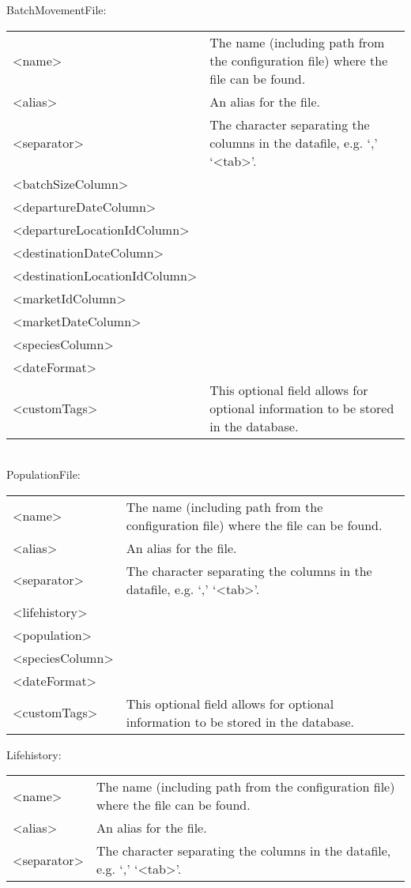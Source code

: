 BatchMovementFile:

\begin{tabulary}{1.0\textwidth}{l p{9cm}}
\toprule
<name> & The name (including path from the configuration file) where the file can be found.\\
<alias> & An alias for the file.\\
<separator> & The character separating the columns in the datafile, e.g. `,' `<tab>'.\\
<batchSizeColumn> & \\
<departureDateColumn> & \\
<departureLocationIdColumn> & \\
<destinationDateColumn> & \\
<destinationLocationIdColumn> & \\
<marketIdColumn> & \\
<marketDateColumn> & \\
<speciesColumn> & \\
<dateFormat> & \\
<customTags> & This optional field allows for optional information to be stored in the database.\\
\bottomrule
\end{tabulary}\\

PopulationFile:

\begin{tabulary}{1.0\textwidth}{l p{9cm}}
\toprule
<name> & The name (including path from the configuration file) where the file can be found.\\
<alias> & An alias for the file.\\
<separator> & The character separating the columns in the datafile, e.g. `,' `<tab>'.\\
<lifehistory> & \\
<population> & \\
<speciesColumn> & \\
<dateFormat> & \\
<customTags> & This optional field allows for optional information to be stored in the database.\\
\bottomrule
\end{tabulary}

Lifehistory:

\begin{tabulary}{1.0\textwidth}{l p{9cm}}
\toprule
<name> & The name (including path from the configuration file) where the file can be found.\\
<alias> & An alias for the file.\\
<separator> & The character separating the columns in the datafile, e.g. `,' `<tab>'.\\
\bottomrule
\end{tabulary}

